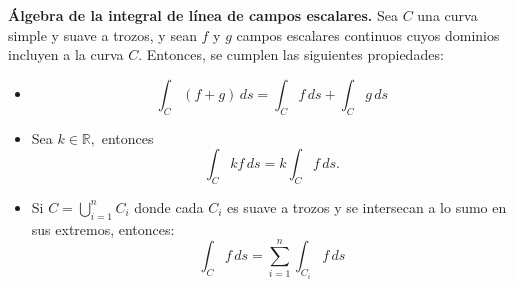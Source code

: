 
\begin{propertie}\label{prep:alg_int_linea_escalares}\textbf{Álgebra de la integral de línea de campos escalares.} 
Sea $C$ una curva simple y suave a trozos, y sean $f$ y $g$ campos escalares continuos cuyos dominios incluyen a la curva $C$. Entonces, se cumplen las siguientes propiedades:
\begin{itemize} 
\item[1.] \[ \int_{C} (f + g) \, ds = \int_{C} f \, ds + \int_{C} g \, ds \] 
\item[2.] Sea  $ k \in \mathbb{R},$ entonces  \[ \int_{C} kf \, ds = k \int_{C} f \, ds. \] 
\item[3.] Si $C = \bigcup_{i=1}^{n} C_{i}$ donde cada $C_i$ es suave a trozos y se intersecan a lo sumo en sus extremos, entonces: 
\[ \int_{C} f \, ds = \sum_{i=1}^{n} \int_{C_{i}} f \, ds \] 
\end{itemize} 
\end{propertie}
